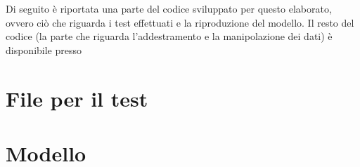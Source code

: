 \appendix
{}
Di seguito è riportata una parte del codice sviluppato per questo elaborato, ovvero ciò che riguarda i test effettuati e la riproduzione del modello. Il resto del codice (la parte che riguarda l'addestramento e la manipolazione dei dati) è disponibile presso \cite{repo}
\section{File per il test} %
\label{sec:test}

\section{Modello} %
\label{sec:prototipo}

